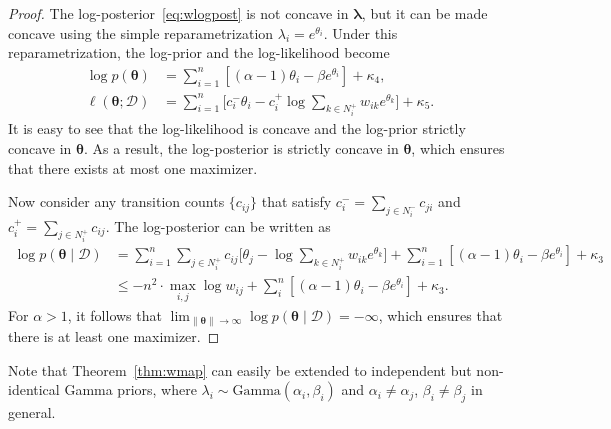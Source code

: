 \begin{proof}
The log-posterior~\eqref{eq:wlogpost} is not concave in $\bm{\lambda}$, but it can be made concave using the simple reparametrization $\lambda_i = e^{\theta_i}$.
Under this reparametrization, the log-prior and the log-likelihood become
\begin{align*}
\log p(\bm{\theta})
    &= \sum_{i = 1}^n \left[ (\alpha - 1) \theta_i - \beta e^{\theta_i} \right] + \kappa_4, \\
\ell(\bm{\theta} ; \mathcal{D})
    &= \sum_{i = 1}^n \bigg[ c^-_i \theta_i - c^+_i \log \sum_{k \in N^+_i} w_{ik} e^{\theta_k} \bigg] + \kappa_5.
\end{align*}
It is easy to see that the log-likelihood is concave and the log-prior strictly concave in $\bm{\theta}$.
As a result, the log-posterior is strictly concave in $\bm{\theta}$, which ensures that there exists at most one maximizer.

Now consider any transition counts $\{ c_{ij} \}$ that satisfy $c^-_i = \sum_{j \in N^-_i} c_{ji}$ and $c^+_i = \sum_{j \in N^+_i} c_{ij}$.
The log-posterior can be written as
\begin{align*}
\log p(\bm{\theta} \mid \mathcal{D})
    &= \sum_{i = 1}^n \sum_{j \in N^+_i} c_{ij} \bigg[ \theta_j - \log \sum_{k \in N^+_i} w_{ik} e^{\theta_k} \bigg]
       + \sum_{i = 1}^n \left[ (\alpha - 1) \theta_i - \beta e^{\theta_i} \right] + \kappa_3\\
    &\le -n^2 \cdot \max_{i,j} \log w_{ij}
       + \sum_i^n \left[ (\alpha - 1) \theta_i - \beta e^{\theta_i} \right] + \kappa_3.
\end{align*}
For $\alpha > 1$, it follows that $\lim_{\lVert \bm{\theta} \rVert \to \infty} \log p(\bm{\theta} \mid \mathcal{D}) = -\infty$, which ensures that there is at least one maximizer.
\end{proof}

Note that Theorem~\ref{thm:wmap} can easily be extended to independent but non-identical Gamma priors, where $\lambda_i \sim \text{Gamma}(\alpha_i, \beta_i)$ and $\alpha_i \ne \alpha_j$, $\beta_i \ne \beta_j$ in general.

